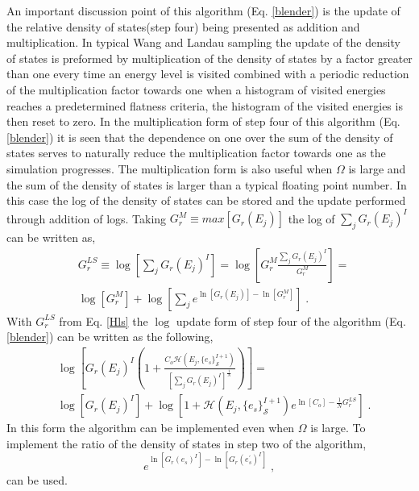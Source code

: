 \documentclass[aps,pre,reprint,superscriptaddress,showkeys]{revtex4-1}
\begin{document}
 


An important discussion point of this algorithm (Eq. \ref{blender}) is the update of the relative density of states(step four) being presented as addition and multiplication.
 In  typical Wang and Landau sampling the update of the density of states is preformed by multiplication of the density of states by a factor greater than one every time an energy level is visited combined with a periodic reduction of the multiplication factor towards one when a histogram of visited energies reaches a predetermined flatness criteria, the histogram of the visited energies is then reset to zero. In the multiplication form of step four of this algorithm (Eq. \ref{blender}) it is seen that the dependence on one over the sum of the density of states serves to naturally reduce the multiplication factor towards one as the simulation progresses. The multiplication form is also useful when $\Omega$ is large and the sum of the density of states is larger than a typical floating point number. In this case the log of the density of states can be stored and the update performed through addition of logs. Taking $G_{r}^M \equiv  max[G_{r}(E_j)]$ the log of $\sum_j G_r(E_j)^{I}$ can be written as, 
\begin{equation}
\begin{split}
&G_{r}^{LS} \equiv \log[\sum_j G_{r}(E_j)^{I}] = \log[G_{r}^M \frac{\sum_j G_{r}(E_j)^{I}}{G_{r}^M}]=\\
&\log[G_{r}^M] + \log[\sum_j e^{\ln[G_{r}(E_j)] - \ln[G_{r}^M]} ] \;.
\end{split}
\label{Hls}
\end{equation} 
With $G_r^{LS}$ from Eq. \ref{Hls} the $\log$ update form of step four of the algorithm (Eq. \ref{blender}) can be written as the following, 
\begin{equation}
\begin{split}
& \log[ G_{r}(E_j)^{I}( 1 +  \frac{C_o \mathcal{H}(E_j,\{e_s\}_{\mathcal{S}}^{I+1}) }{ [\sum_j G_{r}(E_j)^{I}]^{\frac{1}{N} } } ) ]=\\
& \log[ G_{r}(E_j)^{I} ] + \log[1 +   \mathcal{H}(E_j,\{e_s\}_{\mathcal{S}}^{I+1})e^{\ln[C_o]-\frac{1}{N}G_{r}^{LS}}] \;.
\end{split}
\end{equation}
In this form  the algorithm can be implemented even when $\Omega$ is large. To implement the ratio of the density of states in step two of the algorithm, 
\begin{equation}
e^{\ln[G_{r}(e_s)^{I}] - \ln[G_{r}(e_s^{'})^{I}]} \;,
\end{equation}
can be used.
\end{document}
